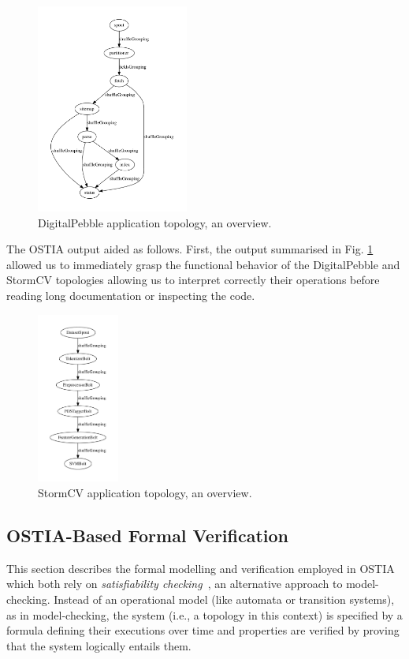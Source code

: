 \begin{figure}
\begin{center}
		\includegraphics[width=5cm]{images/output/crawl}
		\caption{DigitalPebble application topology, an overview.}
		\label{dp}
		\end{center}
\end{figure}

The OSTIA output aided as follows. First, the output summarised in Fig. \ref{dp}
allowed us to immediately grasp the functional behavior of the DigitalPebble and
StormCV topologies allowing us to interpret correctly their operations before
reading long documentation or inspecting the code.

\begin{figure}
\begin{center}
		\includegraphics[width=2.7cm]{images/output/senti_storm}
		\caption{StormCV application topology, an overview.}
		\label{scv}
\end{center}
\end{figure}

\subsection{OSTIA-Based Formal Verification}\label{ver}


This section describes the formal modelling and verification employed in OSTIA  which both rely on \textit{satisfiability checking}~\cite{MPS13}, an alternative approach to model-checking.
Instead of an operational model (like automata or transition systems), as in model-checking, 
the system (i.e., a topology in this context) is specified by a formula defining their executions over time and properties are verified by proving that the system logically entails them.

